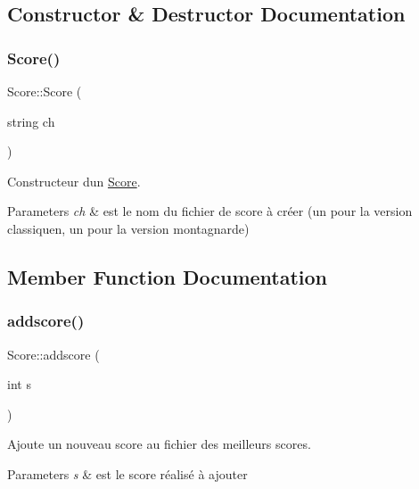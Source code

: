 \subsection{Constructor \& Destructor Documentation}
\mbox{\label{classScore_a93772a8d3e8c9f71cd3e4a0bf74d9e78}} 
\subsubsection{\texorpdfstring{Score()}{Score()}}
{\footnotesize\ttfamily Score\+::\+Score (\begin{DoxyParamCaption}\item[{string}]{ch }\end{DoxyParamCaption})}



Constructeur d\textquotesingle{}un \hyperlink{classScore}{Score}. 


\begin{DoxyParams}{Parameters}
{\em ch} & est le nom du fichier de score à créer (un pour la version classiquen, un pour la version montagnarde) \\
\hline
\end{DoxyParams}


\subsection{Member Function Documentation}
\mbox{\label{classScore_a6575097aed9e43ec2b8c5926e00134c1}} 
\subsubsection{\texorpdfstring{addscore()}{addscore()}}
{\footnotesize\ttfamily Score\+::addscore (\begin{DoxyParamCaption}\item[{int}]{s }\end{DoxyParamCaption})}



Ajoute un nouveau score au fichier des meilleurs scores. 


\begin{DoxyParams}{Parameters}
{\em s} & est le score réalisé à ajouter \\
\hline
\end{DoxyParams}
\mbox{\label{classScore_aed385c5969860d59ca1477e2699c2f54}} 
